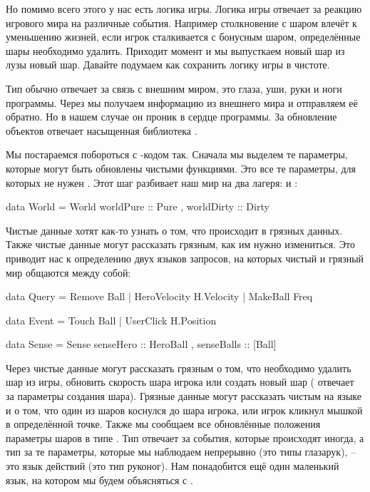 Но помимо 
всего этого у нас есть логика игры. Логика игры отвечает
за реакцию игрового мира на различные события. 
Например столкновение с  шаром влечёт
к уменьшению жизней, если игрок сталкивается с бонусным шаром,
определённые шары необходимо удалить. Приходит
момент и мы выпусткаем новый шар из лузы новый шар. 
Давайте подумаем как сохранить логику игры в чистоте.

Тип  обычно отвечает за связь с внешним миром,
это глаза, уши, руки и ноги программы. Через 
мы получаем информацию из внешнего мира и отправляем
её обратно. Но в нашем случае он проник в сердце программы.
За обновление объектов отвечает насыщенная 
библиотека .

Мы постараемся побороться с -кодом так. 
Сначала мы выделем те параметры, которые могут быть обновлены
чистыми функциями. Это все те параметры, для которых не нужен
. Этот шаг разбивает наш мир на два лагеря:
 и :

\begin{code}
data World = World 
    { worldPure   :: Pure
    , worldDirty  :: Dirty }
\end{code}

Чистые данные хотят как-то узнать о том, что происходит
в грязных данных. Также чистые данные могут рассказать
грязным, как им нужно измениться. Это приводит 
нас к определению двух языков запросов, на которых
чистый и грязный мир общаются между собой:

\begin{code}
data Query = Remove Ball | HeroVelocity H.Velocity | MakeBall Freq

data Event = Touch Ball | UserClick H.Position

data Sense = Sense 
    { senseHero     :: HeroBall
    , senseBalls    :: [Ball]  }
\end{code}

Через  чистые данные могут рассказать грязным
о том, что необходимо удалить шар из игры, обновить скорость
шара игрока или создать новый шар ( отвечает 
за параметры создания шара). Грязные данные могут рассказать
чистым на языке  и  о том, что один
из шаров коснулся до шара игрока, или игрок кликнул мышкой
в определённой точке. Также мы сообщаем все обновлённые
положения параметры шаров в типе . Тип
 отвечает за события, которые происходят
иногда, а тип  за те параметры, которые мы наблюдаем
непрерывно (это типы глазарук),  -- это язык действий
(это тип руконог). Нам понадобится ещё один маленький
язык, на котором мы будем объясняться с . 


